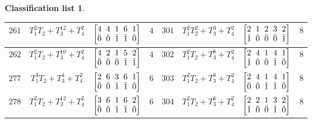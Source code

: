 \documentclass[10pt,a4paper]{amsart}
\theoremstyle{definition}
\newtheorem{class-list}[thm]{Classification list}
\numberwithin{equation}{section}
\begin{document}
\begin{class-list}
\begin{table}[h!]
\begin{tabu}{c|c|c|c||c|c|c|c}
\\
\hline
${261}$&${T_{1}^{2}T_{2}+T_{3}^{12}+T_{4}^{2}}$
&$\arraycolsep=1mm\begin{bmatrix}{4} & {4} & {1} & {6} & {1} \\ {\bar{0}} & {\bar{0}} & {\bar{1}} & {\bar{1}} & {\bar{0}}\end{bmatrix}$&${4}$
&${301}$&${T_{1}^{2}T_{2}^{2}+T_{3}^{3}+T_{4}^{2}}$
&$\arraycolsep=1mm\begin{bmatrix}{2} & {1} & {2} & {3} & {2} \\ {\bar{1}} & {\bar{0}} & {\bar{0}} & {\bar{0}} & {\bar{1}}\end{bmatrix}$&${8}$
\\
\hline
${262}$&${T_{1}^{2}T_{2}+T_{3}^{10}+T_{4}^{2}}$
&$\arraycolsep=1mm\begin{bmatrix}{4} & {2} & {1} & {5} & {2} \\ {\bar{0}} & {\bar{0}} & {\bar{0}} & {\bar{1}} & {\bar{1}}\end{bmatrix}$&${4}$
&${302}$&${T_{1}^{2}T_{2}+T_{3}^{8}+T_{4}^{2}}$
&$\arraycolsep=1mm\begin{bmatrix}{2} & {4} & {1} & {4} & {1} \\ {\bar{1}} & {\bar{0}} & {\bar{0}} & {\bar{1}} & {\bar{0}}\end{bmatrix}$&${8}$
\\
\hline
${277}$&${T_{1}^{3}T_{2}+T_{3}^{4}+T_{4}^{2}}$
&$\arraycolsep=1mm\begin{bmatrix}{2} & {6} & {3} & {6} & {1} \\ {\bar{0}} & {\bar{0}} & {\bar{1}} & {\bar{1}} & {\bar{0}}\end{bmatrix}$&${6}$
&${303}$&${T_{1}^{2}T_{2}+T_{3}^{8}+T_{4}^{2}}$
&$\arraycolsep=1mm\begin{bmatrix}{2} & {4} & {1} & {4} & {1} \\ {\bar{0}} & {\bar{0}} & {\bar{1}} & {\bar{1}} & {\bar{0}}\end{bmatrix}$&${8}$
\\
\hline
${278}$&${T_{1}^{2}T_{2}+T_{3}^{12}+T_{4}^{2}}$
&$\arraycolsep=1mm\begin{bmatrix}{3} & {6} & {1} & {6} & {2} \\ {\bar{0}} & {\bar{0}} & {\bar{1}} & {\bar{1}} & {\bar{0}}\end{bmatrix}$&${6}$
&${304}$&${T_{1}^{2}T_{2}+T_{3}^{6}+T_{4}^{2}}$
&$\arraycolsep=1mm\begin{bmatrix}{2} & {2} & {1} & {3} & {2} \\ {\bar{1}} & {\bar{0}} & {\bar{0}} & {\bar{1}} & {\bar{0}}\end{bmatrix}$&${8}$

\end{tabu}
\end{table}
\end{class-list}
\end{document}
